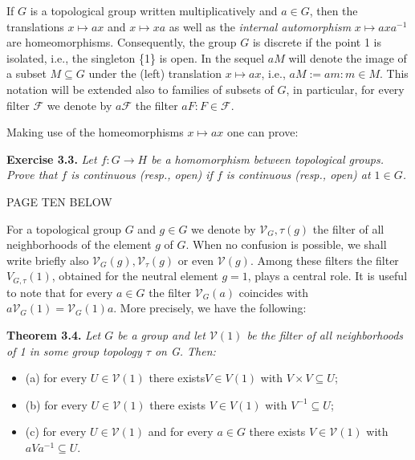 \documentclass[12pt]{article}
\begin{document}
    If $G$ is a topological group written multiplicatively and $a \in G$, then the translations $x \mapsto ax$ and $x \mapsto xa$
as well as the \emph{internal automorphism} $x \mapsto axa^{-1}$ are homeomorphisms. Consequently, the group $G$ is discrete
if the point 1 is isolated, i.e., the singleton \{1\} is open. In the sequel $aM$ will denote the image of a subset
$M \subseteq G$ under the (left) translation $x \mapsto ax$, i.e., $aM := {am : m \in M}$. This notation will be extended also to
families of subsets of $G$, in particular, for every filter $\mathcal{F}$ we denote by $a \mathcal{F}$ the filter ${aF : F \in \mathcal{F}}$.


    Making use of the homeomorphisms $x \mapsto ax$ one can prove:


\textbf{Exercise 3.3.} \emph{Let $f : G \to H$ be a homomorphism between topological groups. Prove that $f$ is continuous
(resp., open) if $f$ is continuous (resp., open) at $1 \in G$.}



    PAGE TEN BELOW



    For a topological group $G$ and $g \in G$ we denote by $\mathcal{V}_G,\tau (g)$ the filter of all neighborhoods of the element $g$
of $G$. When no confusion is possible, we shall write briefly also $\mathcal{V}_G(g), \mathcal{V}_{\tau} (g)$ or even $\mathcal{V}(g)$. Among these filters
the filter $V_{G,\tau} (1)$, obtained for the neutral element $g = 1$, plays a central role. It is useful to note that for every
$a \in G$ the filter $\mathcal{V}_G (a)$ coincides with $a \mathcal{V}_G (1) = \mathcal{V}_G (1) a$. More precisely, we have the following:


\textbf{Theorem 3.4.} \emph{Let $G$ be a group and let $\mathcal{V}(1)$ be the filter of all neighborhoods of 1 in some group topology $\tau$
on G. Then:}


\begin{itemize}

    \item (a) for every $U \in \mathcal{V}(1)$ there exists$ V \in V(1)$ with $V \times V \subseteq U$;

    \item (b) for every $U \in \mathcal{V}(1)$ there exists $V \in V(1)$ with $V^{-1} \subseteq U$;

    \item (c) for every $U \in \mathcal{V}(1)$ and for every $a \in G$ there exists $V \in \mathcal{V}(1)$ with $aV a^{-1} \subseteq U$.

\end{itemize}
\end{document}

